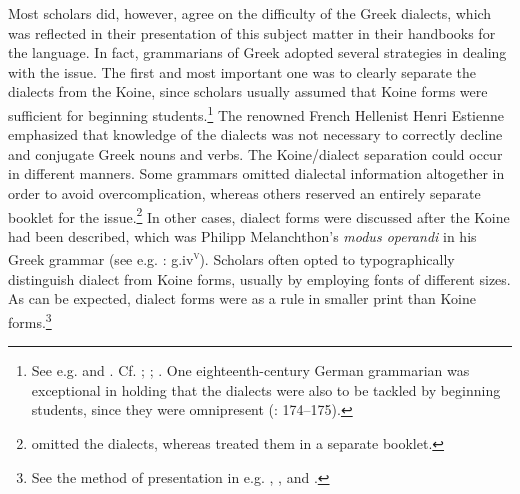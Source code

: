 Most scholars did, however, agree on the difficulty of the Greek dialects, which was reflected in their presentation of this subject matter in their handbooks for the language. In fact, grammarians of Greek adopted several strategies in dealing with the issue. The first and most important one was to clearly separate the dialects from the Koine, since scholars usually assumed that Koine forms were sufficient for beginning students.\footnote{See e.g.  and \citet[223]{Tavoni1986}. Cf. \citet[aa.ii\textsc{\textsuperscript{v}}]{Glarean1524}; \citet[\textsc{a}.ii\textsc{\textsuperscript{v}}]{Metzler1529}; \citet[105]{Rollin1726}. One eighteenth-century German grammarian was exceptional in holding that the dialects were also to be tackled by beginning students, since they were omnipresent (\citealt{Trendelenburg1782}: 174–175).} The renowned French Hellenist Henri Estienne emphasized that knowledge of the dialects was not necessary to correctly decline and conjugate Greek nouns and verbs. The Koine/dialect separation could occur in different manners. Some grammars omitted dialectal information altogether in order to avoid overcomplication, whereas others reserved an entirely separate booklet for the issue.\footnote{\citet[\textsc{b.}iv\textsc{\textsuperscript{r}}]{Caselius1560} omitted the dialects, whereas \citet[†.6\textsc{\textsuperscript{v}}–†.7\textsc{\textsuperscript{r}}]{Walper1589} treated them in a separate booklet.} In other cases, dialect forms were discussed after the Koine had been described, which was Philipp Melanchthon’s \textit{modus operandi} in his Greek grammar (see e.g. \citealt{Melanchthon1518}: g.iv\textsc{\textsuperscript{v}}). Scholars often opted to typographically distinguish dialect from Koine forms, usually by employing fonts of different sizes. As can be expected, dialect forms were as a rule in smaller print than Koine forms.\footnote{See the method of presentation in e.g. \citet{Gretser1593}, \citet{Anon.1613}, and \citet{Lancelot1655}.}

